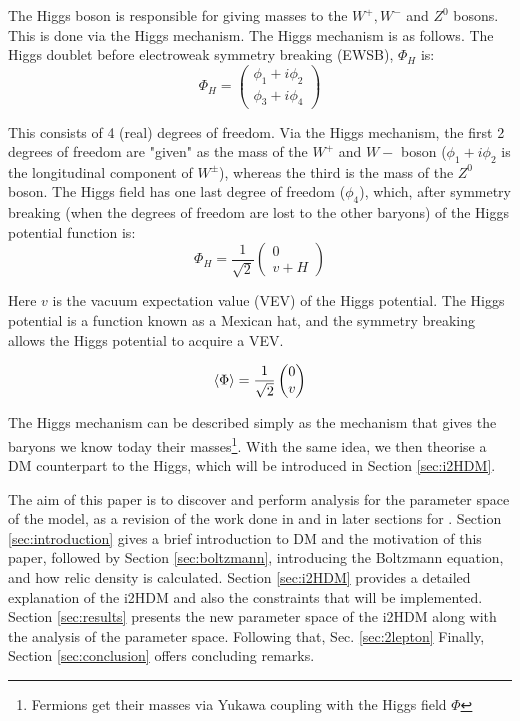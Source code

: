 \documentclass[12pt]{article}
\begin{document}
The Higgs boson is responsible for giving masses to the $W^+, W^-$ and $Z^0$ bosons. This is done via the Higgs mechanism. The Higgs mechanism is as follows.
The Higgs doublet before electroweak symmetry breaking (EWSB), $\Phi_H$ is:
\begin{equation}
    \Phi_H =
    \begin{pmatrix}
        {\phi_1 + i\phi_2} \\
        {\phi_3 + i\phi_4}
    \end{pmatrix}
\end{equation}

This consists of 4 (real) degrees of freedom. Via the Higgs mechanism, the first 2 degrees of freedom are "given" as the mass of the $W^+$ and $W-$ boson ($\phi_1 + i\phi_2$ is the longitudinal component of $W^\pm$), whereas the third is the mass of the $Z^0$ boson. The Higgs field has one last degree of freedom ($\phi_4$), which, after symmetry breaking (when the degrees of freedom are lost to the other baryons) of the Higgs potential function is: 
\begin{equation}
    \Phi_H = \frac{1}{\sqrt{2}}
    \begin{pmatrix}
        {0} \\
        {v + H}
    \end{pmatrix}
\end{equation}

Here $v$ is the vacuum expectation value (VEV) of the Higgs potential. The Higgs potential is a function known as a Mexican hat, and the symmetry breaking allows the Higgs potential to acquire a VEV.

\begin{equation}
    \braket{\Phi} = \frac{1}{\sqrt{2}}
    \begin{pmatrix}
        0\\
        v
    \end{pmatrix}
\end{equation}

The Higgs mechanism can be described simply as the mechanism that gives the baryons we know today their masses\footnote{Fermions get their masses via Yukawa coupling with the Higgs field $\Phi$}. With the same idea, we then theorise a DM counterpart to the Higgs, which will be introduced in Section \ref{sec:i2HDM}.

The aim of this paper is to discover and perform analysis for the parameter space of the model, as a revision of the work done in \cite{Belyaev:2016lok} and in later sections for \cite{Belyaev_2022}. Section \ref{sec:introduction} gives a brief introduction to DM and the motivation of this paper, followed by Section \ref{sec:boltzmann}, introducing the Boltzmann equation, and how relic density is calculated. Section \ref{sec:i2HDM} provides a detailed explanation of the i2HDM and also the constraints that will be implemented. Section \ref{sec:results} presents the new parameter space of the i2HDM along with the analysis of the parameter space. Following that, Sec. \ref{sec:2lepton} Finally, Section \ref{sec:conclusion} offers concluding remarks.
\end{document}
